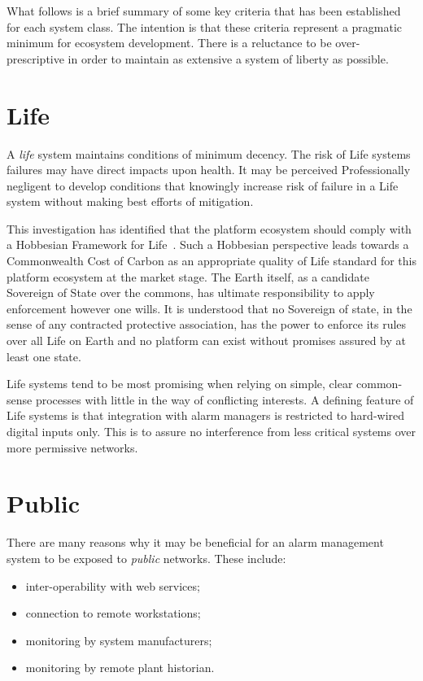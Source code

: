 \documentclass[11pt, oneside]{book}   	%
\begin{document}
\pagebreak

What follows is a brief summary of some key criteria that has been established for each system class.
The intention is that these criteria represent a pragmatic minimum for ecosystem development.
There is a reluctance to be over-prescriptive in order to maintain as extensive a system of liberty as possible.

\section{Life}
A \emph{life} system maintains conditions of minimum decency.
The risk of Life systems failures may have direct impacts upon health.
It may be perceived Professionally negligent to develop conditions that knowingly increase risk of failure in a Life system without making best efforts of mitigation.\

This investigation has identified that the platform ecosystem should comply with a Hobbesian Framework for Life~\cite{th1}.
Such a Hobbesian perspective leads towards a Commonwealth Cost of Carbon as an appropriate quality of Life standard for this platform ecosystem at the market stage.
The Earth itself, as a candidate Sovereign of State over the commons, has ultimate responsibility to apply enforcement however one wills.
It is understood that no Sovereign of state, in the sense of any contracted protective association, has the power to enforce its rules over all Life on Earth and no platform can exist without promises assured by at least one state.\

Life systems tend to be most promising when relying on simple, clear common-sense processes with little in the way of conflicting interests.
A defining feature of Life systems is that integration with alarm managers is restricted to hard-wired digital inputs only.
This is to assure no interference from less critical systems over more permissive networks.\

\section{Public}

There are many reasons why it may be beneficial for an alarm management system to be exposed to \emph{public} networks.
These include:
\begin{itemize}
	\item inter-operability with web services; 
	\item connection to remote workstations;
	\item monitoring by system manufacturers;
	\item monitoring by remote plant historian.
\end{itemize}\
\end{document}
